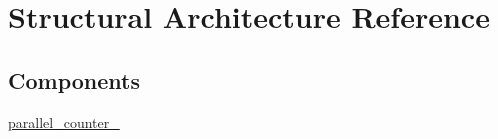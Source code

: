 \hypertarget{classparallel__counter__block_1_1_structural}{\section{Structural Architecture Reference}
\label{classparallel__counter__block_1_1_structural}
}
\subsection*{Components}
 \begin{DoxyCompactItemize}
\item 
\hypertarget{classparallel__counter__block_1_1_structural_ga33875bebede9b27e9a645ca5d664c93e}{\hyperlink{group___majority_voter_ga33875bebede9b27e9a645ca5d664c93e}{parallel\+\_\+counter\+\_}  {\bfseries }  }\label{classparallel__counter__block_1_1_structural_ga33875bebede9b27e9a645ca5d664c93e}

\end{DoxyCompactItemize}
